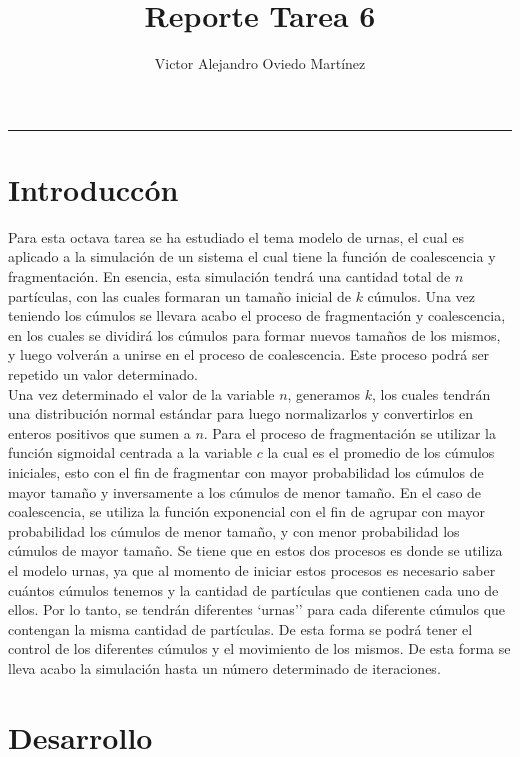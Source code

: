 \documentclass{article}
\title{Reporte Tarea 6}
\author{Victor Alejandro Oviedo Martínez}
\begin{document}
\maketitle
\hrule

\section{Introduccón}\label{intro}
Para esta octava tarea\citep{DRA.P8} se ha estudiado el tema modelo de urnas, el cual es aplicado a la simulación de un sistema el cual tiene la función de coalescencia y fragmentación. En esencia, esta simulación tendrá una cantidad total de $n$ partículas, con las cuales formaran un tamaño inicial de $k$ cúmulos. Una vez teniendo los cúmulos se llevara acabo el proceso de fragmentación y coalescencia, en los cuales se dividirá los cúmulos para formar nuevos tamaños de los mismos, y luego volverán a unirse en el proceso de coalescencia. Este proceso podrá ser repetido un valor determinado.\\

Una vez determinado el valor de la variable $n$, generamos $k$, los cuales tendrán una distribución normal estándar para luego normalizarlos y convertirlos en enteros positivos que sumen a $n$. Para el proceso de fragmentación se utilizar la función sigmoidal centrada a la variable $c$ la cual es el promedio de los cúmulos iniciales, esto con el fin de fragmentar con mayor probabilidad los cúmulos de mayor tamaño y inversamente a los cúmulos de menor tamaño. En el caso de coalescencia, se utiliza la función exponencial con el fin de agrupar con mayor probabilidad los cúmulos de menor tamaño, y con menor probabilidad los cúmulos de mayor tamaño. Se tiene que en estos dos procesos es donde se utiliza el modelo urnas, ya que al momento de iniciar estos procesos es necesario saber cuántos cúmulos tenemos y la cantidad de partículas que contienen cada uno de ellos. Por lo tanto, se tendrán diferentes `urnas'' para cada diferente cúmulos que contengan la misma cantidad de partículas. De esta forma se podrá tener el control de los diferentes cúmulos y el movimiento de los mismos. De esta forma se lleva  acabo la simulación hasta un número determinado de iteraciones.\\




\section{Desarrollo}
\end{document}
